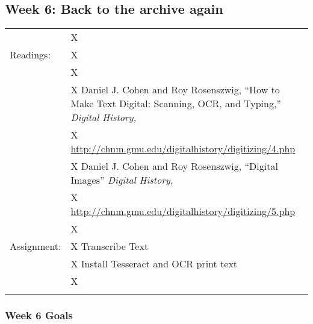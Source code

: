 \documentclass[]{article}
\begin{document}
\subsection{Week 6: Back to the archive
again}\label{week-6-back-to-the-archive-again}

\begin{longtable}[c]{@{}ll@{}}
\toprule\addlinespace
& X
\\\addlinespace
Readings: & X
\\\addlinespace
& X
\\\addlinespace
& X Daniel J. Cohen and Roy Rosenszwig, ``How to Make Text Digital:
Scanning, OCR, and Typing,'' \emph{Digital History,}
\\\addlinespace
& X \url{http://chnm.gmu.edu/digitalhistory/digitizing/4.php}
\\\addlinespace
& X Daniel J. Cohen and Roy Rosenszwig, ``Digital Images'' \emph{Digital
History,}
\\\addlinespace
& X \url{http://chnm.gmu.edu/digitalhistory/digitizing/5.php}
\\\addlinespace
& X
\\\addlinespace
Assignment: & X Transcribe Text
\\\addlinespace
& X Install Tesseract and OCR print text
\\\addlinespace
& X
\\\addlinespace
\bottomrule
\end{longtable}

\subsubsection{Week 6 Goals}\label{week-6-goals}
\end{document}
